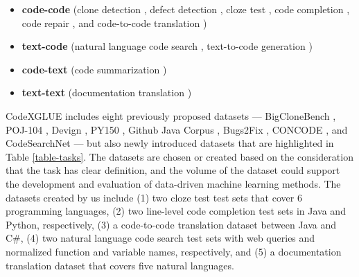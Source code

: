 \documentclass[sigconf,nonacm,screen]{acmart}
\begin{document}
\begin{itemize}
    \item \textbf{code-code} (clone detection \cite{svajlenko2014towards,white2016deep,mou2016convolutional,wang2020detecting,buch2019clone,zhang2019novel,ye2020misim}, defect detection \cite{zhou2019devign,ray2016naturalness,michael2018deepbugs,li2019improving,wang2016bugram,wang2016auto}, cloze test \cite{feng2020codebert}, code completion \cite{raychev2016probabilistic,allamanis2013mining,raychev2014completion,svyatkovskiy2019pythia,svyatkovskiy2020intellicode,bruch2009,hindle2012naturalness,bielik2016phog}, code repair \cite{tufano2019empirical,allamanis2017learning,gupta2017deepfix,hellendoorn2019global,vasic2019neural,vekris2016refine}, and code-to-code translation \cite{nguyen2015divide,karaivanov2014,chen2018tree,lachaux2020unsupervised})
\item \textbf{text-code} (natural language code search \cite{husain2019codesearchnet,gu2018dcs,wang2020trans}, text-to-code generation \cite{iyer2018mapping,clement2020pymt5,yin2017syntactic,wei2019code,xu2020incorporating,yin2018mining,iyer2019learning,guo2019coupling})
\item \textbf{code-text} (code summarization \cite{iyer2016summarizing,clement2020pymt5,fernandes2018structured,wan2018improving,wang2020trans,wei2019code,allamanis2016convolutional,hu2018sum,Wang2020CoCoGUMCC})
\item \textbf{text-text} (documentation translation \cite{johnson2017google})
\end{itemize}



CodeXGLUE includes eight previously proposed datasets — BigCloneBench \cite{svajlenko2014towards}, POJ-104 \cite{mou2016convolutional}, Devign \cite{zhou2019devign}, PY150 \cite{raychev2016probabilistic}, Github Java Corpus \cite{allamanis2013mining}, Bugs2Fix \cite{tufano2019empirical}, CONCODE \cite{iyer2018mapping}, and CodeSearchNet \cite{husain2019codesearchnet}— but also newly introduced datasets that are highlighted in Table \ref{table-tasks}. 
The datasets are chosen or created based on the consideration that the task has clear definition, and the volume of the dataset could support the development and evaluation of data-driven machine learning methods.
The datasets created by us include (1) two cloze test test sets that cover 6 programming languages, (2) two line-level code completion test sets in Java and Python, respectively, (3) a code-to-code translation dataset between Java and C\#, (4) two natural language code search test sets with web queries and normalized function and variable names, respectively, and (5) a documentation translation dataset that covers five natural languages. 
\end{document}

